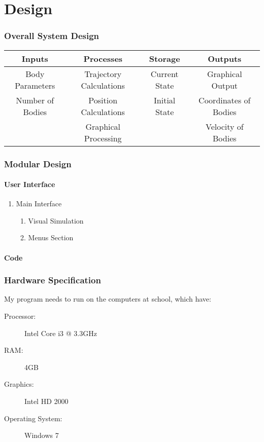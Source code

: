 \part{Design}

\section{Overall System Design}

\begin{tabular}{|c|c|c|c|}
	\hline
	Inputs & Processes & Storage & Outputs \\ \hline
	Body Parameters & Trajectory Calculations 
		& Current State & Graphical Output \\
	Number of Bodies & Position Calculations 
		& Initial State & Coordinates of Bodies \\ 
	& Graphical Processing && Velocity of Bodies \\\hline
	

	
\end{tabular}

\section{Modular Design}

\subsection{User Interface}

\begin{enumerate}
	\item Main Interface
		\begin{enumerate}
			\item Visual Simulation
			\item Menus Section
				
		\end{enumerate}	
\end{enumerate}

\subsection{Code}

\section{Hardware Specification}

My program needs to run on the computers at school, which have:
\begin{description}
	\item[Processor:] Intel Core i3 @ 3.3GHz
	\item[RAM:] 4GB
	\item[Graphics:] Intel HD 2000
	\item[Operating System:] Windows 7
\end{description}

